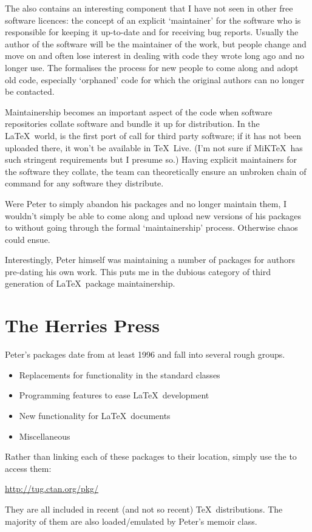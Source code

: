 \documentclass{ltugboat}
\begin{document}
The  also contains an interesting component that I have not seen in other free software licences: the concept of an explicit `maintainer' for the software who is responsible for keeping it up-to-date and for receiving bug reports. Usually the author of the software will be the maintainer of the work, but people change and move on and often lose interest in dealing with code they wrote long ago and no longer use. The  formalises the process for new people to come along and adopt old code, especially `orphaned' code for which the original authors can no longer be contacted.

Maintainership becomes an important aspect of the code when software repositories collate software and bundle it up for distribution. In the \LaTeX\ world,  is the first port of call for third party software; if it has not been uploaded there, it won't be available in \TeX\ Live. (I'm not sure if MiK\TeX\ has such stringent requirements but I presume so.) Having explicit maintainers for the software they collate, the  team can theoretically ensure an unbroken chain of command for any software they distribute.

Were Peter to simply abandon his packages and no longer maintain them, I wouldn't simply be able to come along and upload new versions of his packages to  without going through the formal `maintainership' process. Otherwise chaos could ensue.

Interestingly, Peter himself was maintaining a number of packages for authors pre-dating his own work. This puts me in the dubious category of third generation of \LaTeX\ package maintainership.

\section{The Herries Press}

Peter's packages date from at least 1996 and fall into several rough groups.
\begin{itemize}
\item Replacements for functionality in the standard classes
\item Programming features to ease \LaTeX\ development
\item New functionality for \LaTeX\ documents
\item Miscellaneous
\end{itemize}
Rather than linking each of these packages to their  location, simply use the  to access them:\\ \centerline{\url{http://tug.ctan.org/pkg/}}
They are all included in recent (and not so recent) \TeX\ distributions. The majority of them are also loaded/emulated by Peter's \textsf{memoir} class.
\end{document}
